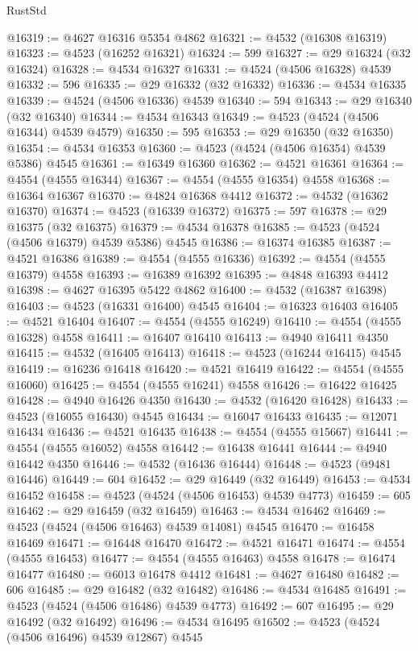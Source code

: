 \begin{lexlean}{RustStd}
\begin{coremodule}
@16319 := @4627 @16316 @5354 @4862
@16321 := @4532 (@16308 @16319)
@16323 := @4523 (@16252 @16321)
@16324 := 599
@16327 := @29 @16324 (@32 @16324)
@16328 := @4534 @16327
@16331 := @4524 (@4506 @16328) @4539
@16332 := 596
@16335 := @29 @16332 (@32 @16332)
@16336 := @4534 @16335
@16339 := @4524 (@4506 @16336) @4539
@16340 := 594
@16343 := @29 @16340 (@32 @16340)
@16344 := @4534 @16343
@16349 := @4523 (@4524 (@4506 @16344) @4539 @4579)
@16350 := 595
@16353 := @29 @16350 (@32 @16350)
@16354 := @4534 @16353
@16360 := @4523 (@4524 (@4506 @16354) @4539 @5386) @4545
@16361 := @16349 @16360
@16362 := @4521 @16361
@16364 := @4554 (@4555 @16344)
@16367 := @4554 (@4555 @16354) @4558
@16368 := @16364 @16367
@16370 := @4824 @16368 @4412
@16372 := @4532 (@16362 @16370)
@16374 := @4523 (@16339 @16372)
@16375 := 597
@16378 := @29 @16375 (@32 @16375)
@16379 := @4534 @16378
@16385 := @4523 (@4524 (@4506 @16379) @4539 @5386) @4545
@16386 := @16374 @16385
@16387 := @4521 @16386
@16389 := @4554 (@4555 @16336)
@16392 := @4554 (@4555 @16379) @4558
@16393 := @16389 @16392
@16395 := @4848 @16393 @4412
@16398 := @4627 @16395 @5422 @4862
@16400 := @4532 (@16387 @16398)
@16403 := @4523 (@16331 @16400) @4545
@16404 := @16323 @16403
@16405 := @4521 @16404
@16407 := @4554 (@4555 @16249)
@16410 := @4554 (@4555 @16328) @4558
@16411 := @16407 @16410
@16413 := @4940 @16411 @4350
@16415 := @4532 (@16405 @16413)
@16418 := @4523 (@16244 @16415) @4545
@16419 := @16236 @16418
@16420 := @4521 @16419
@16422 := @4554 (@4555 @16060)
@16425 := @4554 (@4555 @16241) @4558
@16426 := @16422 @16425
@16428 := @4940 @16426 @4350
@16430 := @4532 (@16420 @16428)
@16433 := @4523 (@16055 @16430) @4545
@16434 := @16047 @16433
@16435 := @12071 @16434
@16436 := @4521 @16435
@16438 := @4554 (@4555 @15667)
@16441 := @4554 (@4555 @16052) @4558
@16442 := @16438 @16441
@16444 := @4940 @16442 @4350
@16446 := @4532 (@16436 @16444)
@16448 := @4523 (@9481 @16446)
@16449 := 604
@16452 := @29 @16449 (@32 @16449)
@16453 := @4534 @16452
@16458 := @4523 (@4524 (@4506 @16453) @4539 @4773)
@16459 := 605
@16462 := @29 @16459 (@32 @16459)
@16463 := @4534 @16462
@16469 := @4523 (@4524 (@4506 @16463) @4539 @14081) @4545
@16470 := @16458 @16469
@16471 := @16448 @16470
@16472 := @4521 @16471
@16474 := @4554 (@4555 @16453)
@16477 := @4554 (@4555 @16463) @4558
@16478 := @16474 @16477
@16480 := @6013 @16478 @4412
@16481 := @4627 @16480
@16482 := 606
@16485 := @29 @16482 (@32 @16482)
@16486 := @4534 @16485
@16491 := @4523 (@4524 (@4506 @16486) @4539 @4773)
@16492 := 607
@16495 := @29 @16492 (@32 @16492)
@16496 := @4534 @16495
@16502 := @4523 (@4524 (@4506 @16496) @4539 @12867) @4545

\end{coremodule}
\end{lexlean}
